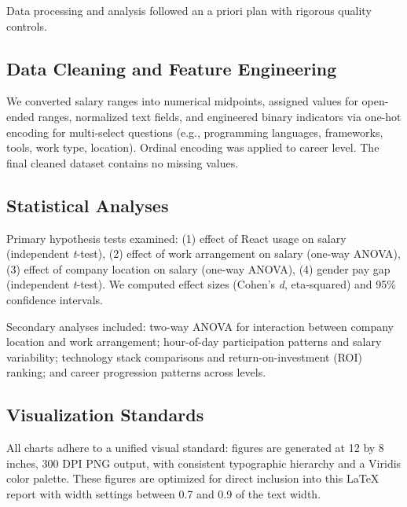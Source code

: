Data processing and analysis followed an a priori plan with rigorous quality controls.

\subsection{Data Cleaning and Feature Engineering}
We converted salary ranges into numerical midpoints, assigned values for open-ended ranges, normalized text fields, and engineered binary indicators via one-hot encoding for multi-select questions (e.g., programming languages, frameworks, tools, work type, location). Ordinal encoding was applied to career level. The final cleaned dataset contains no missing values.

\subsection{Statistical Analyses}
Primary hypothesis tests examined: (1) effect of React usage on salary (independent \textit{t}-test), (2) effect of work arrangement on salary (one-way ANOVA), (3) effect of company location on salary (one-way ANOVA), (4) gender pay gap (independent \textit{t}-test). We computed effect sizes (Cohen's \textit{d}, eta-squared) and 95\% confidence intervals.

Secondary analyses included: two-way ANOVA for interaction between company location and work arrangement; hour-of-day participation patterns and salary variability; technology stack comparisons and return-on-investment (ROI) ranking; and career progression patterns across levels.

\subsection{Visualization Standards}
All charts adhere to a unified visual standard: figures are generated at 12 by 8 inches, 300 DPI PNG output, with consistent typographic hierarchy and a Viridis color palette. These figures are optimized for direct inclusion into this LaTeX report with width settings between 0.7 and 0.9 of the text width.
